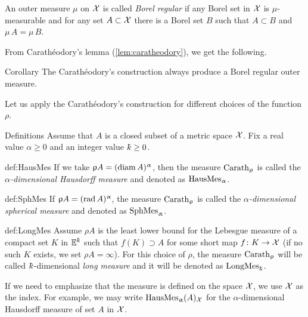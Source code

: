 An outer measure $\mu$ on $\mathcal{X}$ is called \emph{Borel regular} if any Borel set in $\mathcal{X}$ is $\mu$-measurable and for any set $A\subset \spc{X}$ there is a Borel set $B$ such that $A\subset B$ and $\mu\, A=\mu\, B$. 

From Carath\'eodory's lemma (\ref{lem:caratheodory}), we get the following.

\begin{thm}{Corollary}
The Carath\'eodory's construction always produce a Borel regular outer measure.
\end{thm}

Let us apply  the Carath\'eodory's construction for different choices of the function $\rho$.

\begin{thm}{Definitions}
Assume that $A$ is a closed subset of a metric space $\mathcal{X}$.
Fix a real value $\alpha\ge 0$ and an integer value $\kay\ge0$. 

\begin{subthm}{def:HausMes}
If we take $\upvarrho A=(\mathop{\rm diam}\nolimits A)^\upalpha$,
then the measure $\mathop{\rm Carath}\nolimits_\upvarrho$ is called the \emph{$\alpha$-dimensional Hausdorff measure} and denoted as $\mathop{\rm HausMes}\nolimits_\upalpha$.
\end{subthm}

\begin{subthm}{def:SphMes}
If $\upvarrho A=(\mathop{\rm rad}\nolimits A)^\upalpha$, the measure $\mathop{\rm Carath}\nolimits_\upvarrho$ is called the \emph{$\alpha$-dimensional spherical measure} and denoted as 
$\mathop{\rm SphMes}\nolimits_\upalpha$.
\end{subthm}


\begin{subthm}{def:LongMes}
Assume $\rho A$ is the least lower bound for the Lebesgue measure of a compact set $K$ in $\EE^\kay$ 
such that $f(K)\supset A$ for some short map $f\:K\to \spc{X}$
(if no such $K$ exists, 
we set $\rho A=\infty$).
For this choice of $\rho$,
the measure $\mathop{\rm Carath}\nolimits_\upvarrho$ will be called $\kay$-dimensional 
\emph{long measure} 
and it will be denoted as $\LongMes_\kay$.
\end{subthm}

If we need to emphasize that the measure is defined on the space $\mathcal{X}$, we use $\mathcal{X}$ as the index.
For example, we may write $\mathop{\rm HausMes}\nolimits_\upalpha(A)_{\mathcal{X}}$ for the $\alpha$-dimensional Hausdorff measure of set $A$ in $\mathcal{X}$.
\end{thm}


